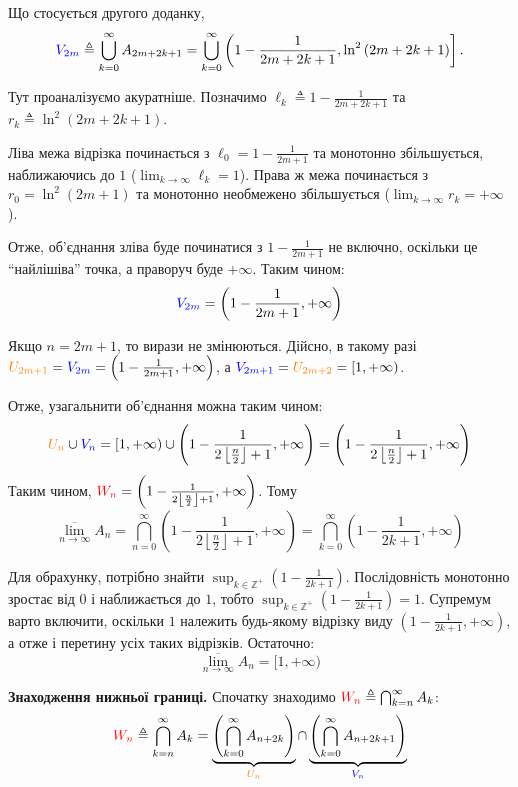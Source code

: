 \documentclass[12pt]{extarticle}
\begin{document}
Що стосується другого доданку,
\[
\textcolor{blue}{V_{2m}} \triangleq \bigcup_{k=0}^{\infty} A_{2m+2k+1} = \bigcup_{k=0}^{\infty} \left(1 - \frac{1}{2m+2k+1}, \ln^2\left(2m+2k+1\right)\right].
\]

Тут проаналізуємо акуратніше. Позначимо $\ell_k \triangleq 1 - \frac{1}{2m+2k+1}$ та $r_k \triangleq \ln^2(2m+2k+1)$. 

Ліва межа відрізка починається з $\ell_0 = 1-\frac{1}{2m+1}$ та монотонно збільшується, наближаючись до $1$ ($\lim_{k \to \infty}\ell_k = 1$). Права ж межа починається з $r_0 = \ln^2(2m+1)$ та монотонно необмежено збільшується ($\lim_{k \to \infty}r_k = +\infty$). 

Отже, об'єднання зліва буде починатися з $1-\frac{1}{2m+1}$ не включно, оскільки це ``найлішіва'' точка, а праворуч буде $+\infty$. Таким чином:
\[
\textcolor{blue}{V_{2m}} = \left(1-\frac{1}{2m+1}, +\infty\right)
\]

Якщо $n=2m+1$, то вирази не змінюються. Дійсно, в такому разі $\textcolor{orange}{U_{2m+1}}=\textcolor{blue}{V_{2m}}=\left(1-\frac{1}{2m+1},+\infty\right)$, а $\textcolor{blue}{V_{2m+1}} = \textcolor{orange}{U_{2m+2}} = [1,+\infty)$. 

Отже, узагальнити об'єднання можна таким чином:
\[
\textcolor{orange}{U_n} \cup \textcolor{blue}{V_n} = [1,+\infty) \cup \left(1 - \frac{1}{2\left\lfloor\frac{n}{2}\right\rfloor + 1},+\infty\right) = \left(1 - \frac{1}{2\left\lfloor\frac{n}{2}\right\rfloor + 1},+\infty\right)
\]
Таким чином, $\textcolor{red}{W_n} = \left(1 - \frac{1}{2\left\lfloor\frac{n}{2}\right\rfloor + 1},+\infty\right)$. Тому
\[
\underset{n \to \infty}{\overline{\lim}} A_n = \bigcap_{n=0}^{\infty} \left(1 - \frac{1}{2\left\lfloor\frac{n}{2}\right\rfloor + 1},+\infty\right) = \bigcap_{k=0}^{\infty} \left(1 - \frac{1}{2k+1}, +\infty\right)
\]

Для обрахунку, потрібно знайти $\sup_{k \in \mathbb{Z}^+} \left(1 - \frac{1}{2k+1}\right)$. Послідовність монотонно зростає від $0$ і наближається до $1$, тобто $\sup_{k \in \mathbb{Z}^+} \left(1 - \frac{1}{2k+1}\right) = 1$. Супремум варто включити, оскільки $1$ належить будь-якому відрізку виду $(1-\frac{1}{2k+1},+\infty)$, а отже і перетину усіх таких відрізків. Остаточно:
\[
\underset{n \to \infty}{\overline{\lim}} A_n = [1, +\infty)
\]

\textbf{Знаходження нижньої границі.} Спочатку знаходимо $\textcolor{red}{W_n} \triangleq \bigcap_{k=n}^{\infty}A_k$:
\[
\textcolor{red}{W_n} \triangleq\bigcap_{k=n}^{\infty}A_k = \underbrace{\left(\bigcap_{k=0}^{\infty}A_{n+2k}\right)}_{\textcolor{orange}{U_n}} \cap \underbrace{\left(\bigcap_{k=0}^{\infty}A_{n+2k+1}\right)}_{\textcolor{blue}{V_n}}
\]
\end{document}
